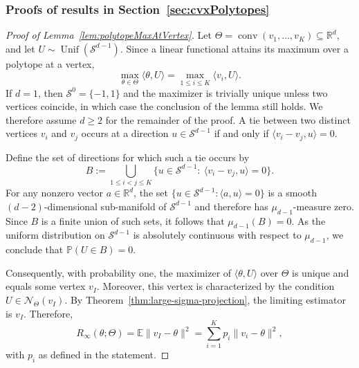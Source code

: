 \documentclass[11pt]{article}
\theoremstyle{plain}
\theoremstyle{definition}
\providecommand{\mathbbm}{\mathbb} %
\newcommand{\R}{\mathbbm{R}}
\newcommand{\E}{\mathbb{E}}
\renewcommand{\P}{\mathbb{P}}
\newcommand{\mcN}{\mathcal{N}}
\newcommand{\mcS}{\mathcal{S}}
\begin{document}
\subsubsection{Proofs of results in Section~\ref{sec:cvxPolytopes}}
\begin{proof}[Proof of Lemma~\ref{lem:polytopeMaxAtVertex}]
Let $\Theta=\operatorname{conv}(v_1,\ldots,v_K) \subseteq \R^d$, and let
$U\sim \operatorname{Unif}(\mathcal S^{d-1})$.
Since a linear functional attains its maximum over a polytope at a vertex,
\[
\max_{\theta\in\Theta}\langle \theta,U\rangle
=
\max_{1\le i\le K}\langle v_i,U\rangle.
\]
If $d=1$, then $\mcS^{0}=\{-1,1\}$ and the maximizer is trivially unique
unless two vertices coincide, in which case the conclusion of the lemma still
holds. We therefore assume $d\ge2$ for the remainder of the proof.
A tie between two distinct vertices $v_i$ and $v_j$ occurs at a direction
$u\in\mathcal S^{d-1}$ if and only if $\langle v_i-v_j,u\rangle=0$.

Define the set of directions for which such a tie occurs by
\[
B
:=
\bigcup_{1\le i<j\le K}
\{ u\in\mathcal S^{d-1}:\ \langle v_i-v_j,u\rangle=0 \}.
\]
For any nonzero vector $a\in\R^d$, the set $\{u\in\mathcal S^{d-1}:\langle a,u\rangle=0\}$ is a smooth $(d-2)$-dimensional sub-manifold of $\mathcal S^{d-1}$ and therefore
has $\mu_{d-1}$-measure zero. Since $B$ is a finite union of such sets, it follows that $\mu_{d-1}(B)=0$. As the uniform distribution on $\mathcal S^{d-1}$ is absolutely continuous with
respect to $\mu_{d-1}$, we conclude that $\P(U\in B)=0$.

Consequently, with probability one, the maximizer of
$\langle \theta,U\rangle$ over $\Theta$ is unique and equals some vertex $v_I$.
Moreover, this vertex is characterized by the condition $U \in \mcN_\Theta(v_I)$. 
By Theorem~\ref{thm:large-sigma-projection}, the limiting estimator is $v_I$.
Therefore,
\[
    R_\infty(\theta;\Theta)
    =
    \E\|v_I-\theta\|^2
    =
    \sum_{i=1}^K p_i\|v_i-\theta\|^2,
\]
with $p_i$ as defined in the statement.
\end{proof}
\end{document}

